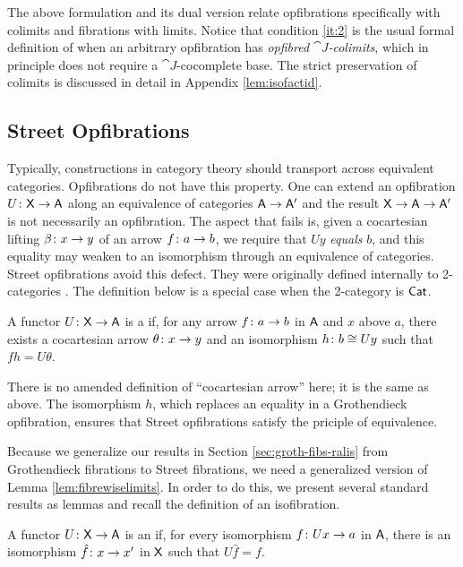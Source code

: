 \documentclass{amsart}
\begin{document}
The above formulation and its dual version relate opfibrations specifically with colimits and fibrations with limits. Notice that condition \ref{it:2} is the usual formal definition of when an arbitrary opfibration has \emph{opfibred $\cat{J}$-colimits}, which in principle does not require a $\cat{J}$-cocomplete base. The strict preservation of colimits is discussed in detail in Appendix \ref{lem:isofactid}.

\subsection*{Street Opfibrations}

Typically, constructions in category theory should transport across equivalent categories. Opfibrations do not have this property. One can extend an opfibration $U\colon\mathsf{X}\to\mathsf{A}$ along an equivalence of categories $\mathsf{A} \to \mathsf{A}'$ and the result $\mathsf{X}\to\mathsf{A}\to\mathsf{A}'$ is not necessarily an opfibration. The aspect that fails is, given a cocartesian lifting $\beta\colon x \to y$ of an arrow $f\colon a \to b$, we require that $Uy$ \emph{equals} $b$, and this equality may weaken to an isomorphism through an equivalence of categories. Street opfibrations avoid this defect. They were originally defined internally to 2-categories \cite{FibYon}. The definition below is a special case when the 2-category is $\mathsf{Cat}$.

\begin{defn}
  A functor $ U \colon \mathsf{X} \to \mathsf{A} $ is a  if, for any arrow $ f \colon a \to b $ in $ \mathsf{A}
  $ and $ x $ above $ a $, there exists a
  cocartesian arrow  $ \theta \colon x \to y $ and an
  isomorphism $ h \colon b \cong Uy $ such that $ fh = U\theta $.
\end{defn}

There is no amended definition of ``cocartesian arrow'' here; it is the same as above. The isomorphism $ h $, which replaces an equality in a Grothendieck opfibration, ensures that Street opfibrations satisfy the priciple of equivalence.

Because we generalize our results in Section \ref{sec:groth-fibs-ralis} from Grothendieck fibrations to Street fibrations, we need a generalized version of Lemma \ref{lem:fibrewiselimits}. In order to do this, we present several standard results as lemmas and recall the definition of an isofibration.

\begin{defn}
  A functor $U \colon \mathsf{X} \to \mathsf{A}$ is an  if, for every isomorphism $f \colon Ux \to a$ in $\mathsf{A}$, there is an isomorphism $\hat{f} \colon x \to x'$ in $\mathsf{X}$ such that $U\hat{f}=f$. 
\end{defn}
\end{document}

